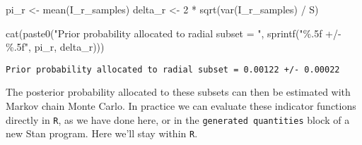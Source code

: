 \documentclass[
  letterpaper,
  DIV=11,
  numbers=noendperiod]{scrartcl}
\newenvironment{Shaded}{\begin{snugshade}}{\end{snugshade}}
\newcommand{\ControlFlowTok}[1]{\textcolor[rgb]{0.00,0.23,0.31}{#1}}
\newcommand{\DecValTok}[1]{\textcolor[rgb]{0.68,0.00,0.00}{#1}}
\newcommand{\FunctionTok}[1]{\textcolor[rgb]{0.28,0.35,0.67}{#1}}
\newcommand{\NormalTok}[1]{\textcolor[rgb]{0.00,0.23,0.31}{#1}}
\newcommand{\OtherTok}[1]{\textcolor[rgb]{0.00,0.23,0.31}{#1}}
\newcommand{\SpecialCharTok}[1]{\textcolor[rgb]{0.37,0.37,0.37}{#1}}
\newcommand{\StringTok}[1]{\textcolor[rgb]{0.13,0.47,0.30}{#1}}
\begin{document}
\begin{Shaded}
\begin{Highlighting}[]
\NormalTok{pi\_r }\OtherTok{\textless{}{-}} \FunctionTok{mean}\NormalTok{(I\_r\_samples)}
\NormalTok{delta\_r }\OtherTok{\textless{}{-}} \DecValTok{2} \SpecialCharTok{*} \FunctionTok{sqrt}\NormalTok{(}\FunctionTok{var}\NormalTok{(I\_r\_samples) }\SpecialCharTok{/}\NormalTok{ S)}

\FunctionTok{cat}\NormalTok{(}\FunctionTok{paste0}\NormalTok{(}\StringTok{"Prior probability allocated to radial subset = "}\NormalTok{,}
           \FunctionTok{sprintf}\NormalTok{(}\StringTok{"\%.5f +/{-} \%.5f"}\NormalTok{, pi\_r, delta\_r)))}
\end{Highlighting}
\end{Shaded}

\begin{verbatim}
Prior probability allocated to radial subset = 0.00122 +/- 0.00022
\end{verbatim}

The posterior probability allocated to these subsets can then be
estimated with Markov chain Monte Carlo. In practice we can evaluate
these indicator functions directly in \texttt{R}, as we have done here,
or in the \texttt{generated\ quantities} block of a new Stan program.
Here we'll stay within \texttt{R}.

\begin{Shaded}
\end{Shaded}
\end{document}
